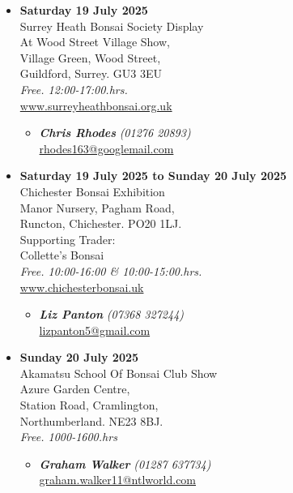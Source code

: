 \begin{itemize}
    \item \textbf{Saturday 19 July 2025}
    \\
    Surrey Heath Bonsai Society Display \\
    At Wood Street Village Show, \\
    Village Green, Wood Street, \\
    Guildford, Surrey. GU3 3EU
    \\
    \emph{Free. 12:00-17:00.hrs.}
    \\
    \href{https://www.surreyheathbonsai.org.uk}{www.surreyheathbonsai.org.uk}
    \begin{itemize}
        \item \textbf{\emph{Chris Rhodes}} \emph{(01276 20893)} \\
        \href{mailto:rhodes163@googlemail.com}{rhodes163@googlemail.com} 
    \end{itemize}

    \item \textbf{Saturday 19 July 2025 to Sunday 20 July 2025}
    \\
    Chichester Bonsai Exhibition \\
    Manor Nursery, Pagham Road, \\
    Runcton, Chichester. PO20 1LJ. \\
    Supporting Trader: \\
    Collette's Bonsai
    \\
    \emph{Free. 10:00-16:00 \& 10:00-15:00.hrs.}
    \\
    \href{http://www.chichesterbonsai.uk/}{www.chichesterbonsai.uk}
    \begin{itemize}
        \item \textbf{\emph{Liz Panton}} \emph{(07368 327244)} \\
        \href{mailto:lizpanton5@gmail.com}{lizpanton5@gmail.com} 
    \end{itemize}

    \item \textbf{Sunday 20 July 2025}
    \\
    Akamatsu School Of Bonsai Club Show \\
    Azure Garden Centre, \\
    Station Road, Cramlington, \\
    Northumberland. NE23 8BJ.
    \\
    \emph{Free. 1000-1600.hrs}
    \begin{itemize}
        \item \textbf{\emph{Graham Walker}} \emph{(01287 637734)} \\
        \href{mailto:graham.walker11@ntlworld.com}{graham.walker11@ntlworld.com} 
    \end{itemize}
\end{itemize}
\closearticle

